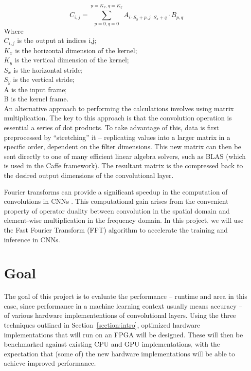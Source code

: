 \documentclass[conference,compsoc]{IEEEtran/IEEEtran}
\begin{document}
\begin{equation}\label{eq:conv}
C_{i,j} = \sum_{p=0,q=0}^{p=K_x,q=K_y}A_{i\cdot S_y + p, j\cdot S_x + q}\cdot B_{p,q} 
\end{equation}
Where\\ 
\hspace*{2em} $C_{i,j}$ is the output at indices i,j;\\
\hspace*{2em} $K_x$ is the horizontal dimension of the kernel;\\
\hspace*{2em} $K_y$ is the vertical dimension of the kernel;\\
\hspace*{2em} $S_x$ is the horizontal stride;\\
\hspace*{2em} $S_y$ is the vertical stride;\\
\hspace*{2em} A is the input frame;\\
\hspace*{2em} B is the kernel frame.\\

An alternative approach to performing the calculations involves using matrix multiplication.
The key to this approach is that the convolution operation is essential a series of dot products.
To take advantage of this, data is first preprocessed by ``stretching'' it -- replicating values into a larger matrix in a specific order, dependent on the filter dimensions.
This new matrix can then be sent directly to one of many efficient linear algebra solvers, such as BLAS (which is used in the Caffe framework).
The resultant matrix is the compressed back to the desired output dimensions of the convolutional layer.

Fourier transforms can provide a significant speedup in the computation of convolutions in CNNs \cite{FFT1, FFT2}. This computational gain arises from the convenient property of operator duality between convolution in the spatial domain and element-wise multiplication in the frequency domain. In this project, we will use the Fast Fourier Transform (FFT) algorithm to accelerate the training and inference in CNNs.


\section{Goal}\label{section:goal}

The goal of this project is to evaluate the performance -- runtime and area in this case, since performance in a machine learning context usually means accuracy -- of various hardware implemententions of convolutional layers.
Using the three techniques outlined in Section~\ref{section:intro}, optimized hardware implementations that will run on an FPGA will be designed.
These will then be benchmarked against existing CPU and GPU implementations, with the expectation that (some of) the new hardware implementations will be able to achieve improved performance.
\end{document}
